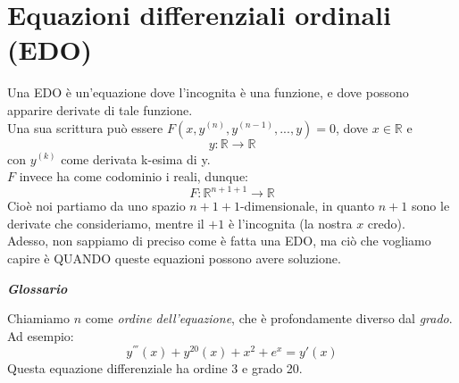 \documentclass{article}
\theoremstyle{definition}
\newcommand{\R}{\mathbb{R}}
\begin{document}
 \section{Equazioni differenziali ordinali (EDO)}
Una EDO è un'equazione dove l'incognita è una funzione, e dove possono apparire derivate di tale funzione.
\\
Una sua scrittura può essere $F(x,y^{(n)}, y^{(n-1)},...,y)=0$, dove $x \in \R$ e 
\begin{equation}
    y: \R \to \R
\end{equation}
con $y^{(k)}$ come derivata k-esima di y.
\\
$F$ invece ha come codominio i reali, dunque:
\begin{equation}
    F: \R^{n+1+1} \to \R
\end{equation}
Cioè noi partiamo da uno spazio $n+1+1$-dimensionale, in quanto $n+1$ sono le derivate che consideriamo, mentre il $+1$ è l'incognita (la nostra $x$ credo).
\\
Adesso, non sappiamo di preciso come è fatta una EDO, ma ciò che vogliamo capire è QUANDO queste equazioni possono avere soluzione.
\begin{center}
    \textbf{\textit{Glossario}}
\end{center}
Chiamiamo $n$ come \textit{ordine dell'equazione}, che è profondamente diverso dal \textit{grado}.
\\
Ad esempio:
\begin{equation}
    y^{'''}(x)+y^{20}(x)+x^2+e^x=y'(x)
\end{equation}
Questa equazione differenziale ha ordine 3 e grado 20.
\end{document}
